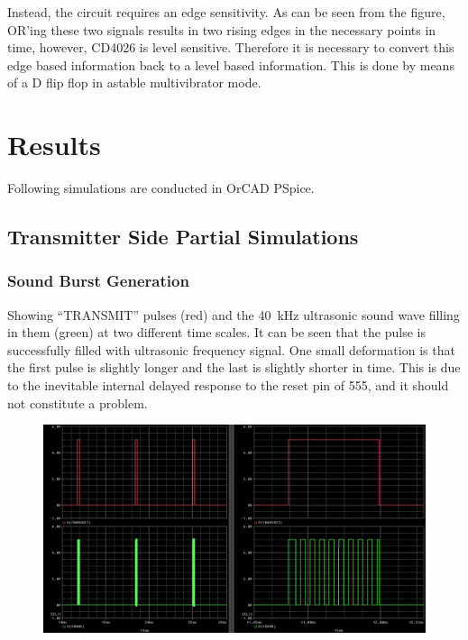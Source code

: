 \documentclass[12pt, a4paper]{article}
\begin{document}
                Instead, the circuit requires an edge sensitivity. As can be seen from the figure, OR'ing these two signals results in two rising edges in the necessary points in time, however, CD4026 is level sensitive. Therefore it is necessary to convert this edge based information back to a level based information. This is done by means of a D flip flop in astable multivibrator mode.



	    

    \pagebreak
    \section{Results}
        
        \noindent Following simulations are conducted in OrCAD PSpice. 

        \subsection{Transmitter Side Partial Simulations}

            \subsubsection{Sound Burst Generation}

                \noindent Showing ``TRANSMIT'' pulses (red) and the \SI{40}{\kilo\hertz} ultrasonic sound wave filling in them (green) at two different time scales. It can be seen that the pulse is successfully filled with ultrasonic frequency signal. One small deformation is that the first pulse is slightly longer and the last is slightly shorter in time. This is due to the inevitable internal delayed response to the reset pin of 555, and it should not constitute a problem.

                \begin{figure}[H]\centering
                    \includegraphics[width = \textwidth]{simulations/transmit/burst_and_ultra.png}
                    \caption[]{}
                \end{figure}
            
\end{document}
